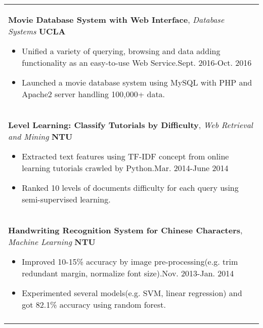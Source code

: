 \documentclass[a4paper,10pt]{article} %
\begin{document}
{\begin{tabular}{p{18.5cm}}
{\fontsize{11}{13.2}\textbf{Movie Database System with Web Interface}}, {\it{Database Systems}} \hfill \textbf{UCLA} 
\vspace{0.5mm}
\begin{itemize}
\item Unified a variety of querying, browsing and data adding functionality as an easy-to-use Web Service.\hfill Sept. 2016-Oct. 2016
\item Launched a movie database system using MySQL with PHP and Apache2 server handling 100,000+ data.\vspace*{-\baselineskip}
\end{itemize} \\
\vspace{0.5mm}

{\fontsize{11}{13.2}\textbf{Level Learning: Classify Tutorials by Difficulty}}, {\it{Web Retrieval and Mining}} \hfill \textbf{NTU} 
\vspace{0.5mm}
\begin{itemize}
\item Extracted text features using TF-IDF concept from online learning tutorials crawled by Python.\hfill Mar. 2014-June 2014
\item Ranked 10 levels of documents difficulty for each query using semi-supervised learning.\vspace*{-\baselineskip}
\end{itemize}\\
\vspace{0.5mm}

{\fontsize{11}{13.2}\textbf{Handwriting Recognition System for Chinese Characters}}, {\it{Machine Learning}} \hfill \textbf{NTU}  
\vspace{0.5mm}
\begin{itemize}
\item Improved 10-15\% accuracy by image pre-processing(e.g. trim redundant margin, normalize font size).\hfill  Nov. 2013-Jan. 2014
\item Experimented several models(e.g. SVM, linear regression) and got 82.1\% accuracy using random forest.\vspace*{-\baselineskip}
\end{itemize}\\
\vspace{0.5mm}


\end{tabular}}
\end{document}
